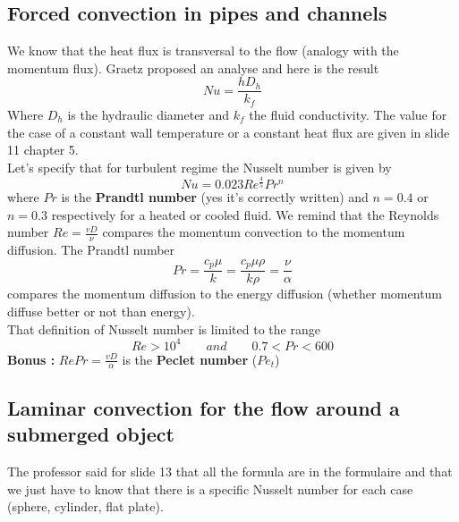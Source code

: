 	\subsection{Forced convection in pipes and channels}
	\label{subsec:5.3.3}
		We know that the heat flux is transversal to the flow (analogy with the momentum flux). Graetz proposed an analyse and here is the result
		\begin{equation}
			Nu = \frac{hD_h}{k_f}
		\end{equation}		
		Where $D_h$ is the hydraulic diameter and $k_f$ the fluid conductivity. The value for the case of a constant wall temperature or a constant heat flux are given in slide 11 chapter 5. \\
	Let's specify that for turbulent regime the Nusselt number is given by 
	\begin{equation}
	Nu = 0.023 Re^{\frac{4}{5}}Pr^n
\end{equation}		
	where $Pr$ is the \textbf{Prandtl number} (yes it's correctly written) and $n=0.4$ or $n=0.3$ respectively for a heated or cooled fluid. We remind that the Reynolds number $Re = \frac{vD}{\nu}$ compares the momentum convection to the momentum diffusion. The Prandtl number 
	\begin{equation}
			Pr = \frac{c_p \mu}{k} = \frac{c_p \mu \rho}{k\rho} = \frac{\nu}{\alpha}
	\end{equation}
	compares the momentum diffusion to the energy diffusion (whether momentum diffuse better or not than energy). \\
	That definition of Nusselt number is limited to the range 
	\begin{equation}
		Re > 10^4 \qquad and \qquad 0.7 < Pr < 600
	\end{equation}
	\textbf{Bonus :} $RePr = \frac{vD}{\alpha}$ is the \textbf{Peclet number} ($Pe_t$)

	\subsection{Laminar convection for the flow around a submerged object}
		The professor said for slide 13 that all the formula are in the formulaire and that we just have to know that there is a specific Nusselt number for each case (sphere, cylinder, flat plate).
		

